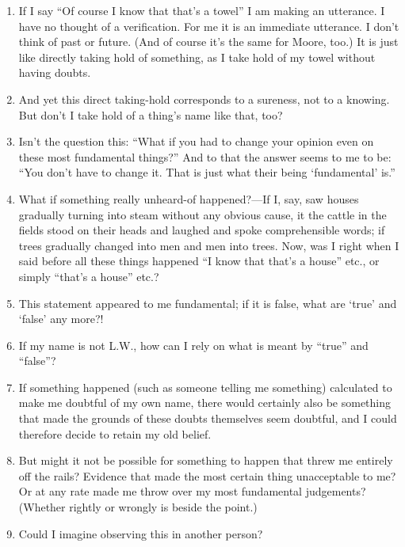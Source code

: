 \documentclass{book}
\begin{document}
\begin{enumerate}
\item
If I say ``Of course I know that that's a towel'' I am making an utterance. I
have no thought of a verification. For me it is an immediate utterance.  I
don't think of past or future. (And of course it's the same for Moore, too.) It
is just like directly taking hold of something, as I take hold of my towel
without having doubts.

\item
And yet this direct taking-hold corresponds to a sureness, not to a knowing.
But don't I take hold of a thing's name like that, too?

\item
Isn't the question this: ``What if you had to change your opinion even on these
most fundamental things?'' And to that the answer seems to me to be: ``You
don't have to change it. That is just what their being `fundamental' is.''

\item
What if something really unheard-of happened?---If I, say, saw houses gradually
turning into steam without any obvious cause, it the cattle in the fields stood
on their heads and laughed and spoke comprehensible words; if trees gradually
changed into men and men into trees. Now, was I right when I said before all
these things happened ``I know that that's a house'' etc., or simply ``that's a
house'' etc.?

\item
This statement appeared to me fundamental; if it is false, what are `true' and
`false' any more?!

\item
If my name is not L.W., how can I rely on what is meant by ``true'' and
``false''?

\item
If something happened (such as someone telling me something) calculated to make
me doubtful of my own name, there would certainly also be something that made
the grounds of these doubts themselves seem doubtful, and I could therefore
decide to retain my old belief.

\item
But might it not be possible for something to happen that threw me entirely off
the rails? Evidence that made the most certain thing unacceptable to me? Or at
any rate made me throw over my most fundamental judgements? (Whether rightly or
wrongly is beside the point.)

\item
Could I imagine observing this in another person?


\end{enumerate}
\end{document}
